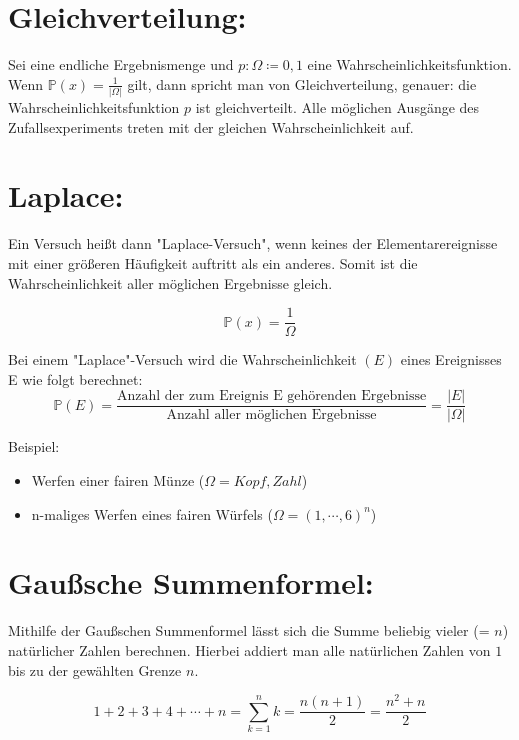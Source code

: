 \documentclass[11pt]{article}
\begin{document}
    \section{Gleichverteilung:}\label{sec:gleichverteilung:}

    Sei \Omega eine endliche Ergebnismenge und \(p : \Omega \coloneqq {0, 1}\) eine Wahrscheinlichkeitsfunktion.
    Wenn \( \mathbb{P}(x) = \frac{1}{|\Omega|}\) gilt, dann spricht man von Gleichverteilung,
    genauer: die Wahrscheinlichkeitsfunktion \(p\) ist gleichverteilt.
    Alle möglichen Ausgänge des Zufallsexperiments treten mit der gleichen Wahrscheinlichkeit auf.


    \section{Laplace:}\label{sec:laplace:}

    Ein Versuch heißt dann "Laplace-Versuch", wenn keines der Elementarereignisse mit einer größeren
    Häufigkeit auftritt als ein anderes.
    Somit ist die Wahrscheinlichkeit aller möglichen Ergebnisse gleich.

    \[\mathbb{P}(x)= \frac{1}{\Omega}\]

    Bei einem "Laplace"-Versuch wird die Wahrscheinlichkeit \((E)\) eines Ereignisses E wie folgt berechnet:
    \[\mathbb{P}(E)= \frac{\text{Anzahl der zum Ereignis E gehörenden Ergebnisse}} {\text{Anzahl aller möglichen Ergebnisse}} = \frac{|E|} {|\Omega|}\]


    Beispiel:
    \begin{itemize}
        \item Werfen einer fairen Münze (\(\Omega= {Kopf, Zahl}\))
    \end{itemize}
    \begin{itemize}
        \item n-maliges Werfen eines fairen Würfels (\(\Omega=({1,\cdots,6}) ^n\))
    \end{itemize}


    \section{Gaußsche Summenformel: }

    Mithilfe der Gaußschen Summenformel lässt sich die Summe beliebig vieler (= \(n\)) natürlicher Zahlen berechnen.
    Hierbei addiert man alle natürlichen Zahlen von \(1\) bis zu der gewählten Grenze \(n\).

    \[1 +2 +3+ 4+ \cdots +n = \sum \limits_{k=1}^{n} k = \frac{n(n+1)}{2} = \frac {n^{2}+n}{2}\]
\end{document}
